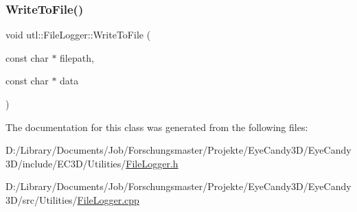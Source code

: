\mbox{\label{classutl_1_1_file_logger_a05b05806b51da47772c9af14c4dabf41}} 
\subsubsection{\texorpdfstring{Write\+To\+File()}{WriteToFile()}}
{\footnotesize\ttfamily void utl\+::\+File\+Logger\+::\+Write\+To\+File (\begin{DoxyParamCaption}\item[{const char $\ast$}]{filepath,  }\item[{const char $\ast$}]{data }\end{DoxyParamCaption})\hspace{0.3cm}{\ttfamily [static]}}



The documentation for this class was generated from the following files\+:\begin{DoxyCompactItemize}
\item 
D\+:/\+Library/\+Documents/\+Job/\+Forschungsmaster/\+Projekte/\+Eye\+Candy3\+D/\+Eye\+Candy3\+D/include/\+E\+C3\+D/\+Utilities/\mbox{\hyperlink{_file_logger_8h}{File\+Logger.\+h}}\item 
D\+:/\+Library/\+Documents/\+Job/\+Forschungsmaster/\+Projekte/\+Eye\+Candy3\+D/\+Eye\+Candy3\+D/src/\+Utilities/\mbox{\hyperlink{_file_logger_8cpp}{File\+Logger.\+cpp}}\end{DoxyCompactItemize}
